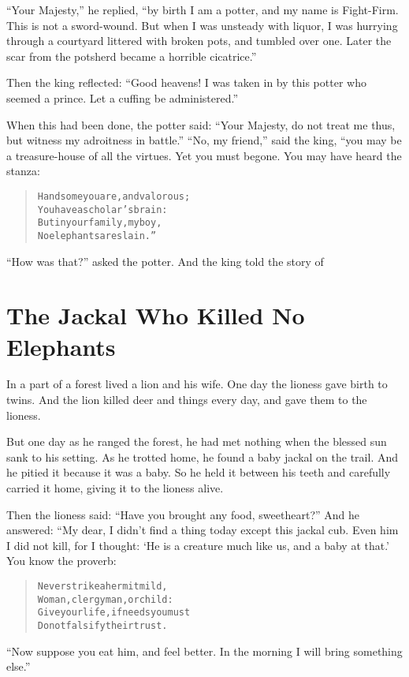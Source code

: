 \documentclass[article, twoside, 14pt]{memoir}
\renewenvironment{verbatim}{%
\begin{quote}%
\vskip -10pt%
\begin{alltt}\normalfont\large}{\end{alltt}%
\end{quote}%
\vskip -10pt
} %
\begin{document}
``Your Majesty,'' he replied,
``by birth I am a potter, and my name is Fight-Firm. This is not a sword-wound. But when I was unsteady with liquor, I was hurrying through a courtyard littered with broken pots, and tumbled over one. Later the scar from the potsherd became a horrible cicatrice.''

Then the king reflected:
``Good heavens! I was taken in by this potter who seemed a prince. Let a cuffing be administered.''

When this had been done, the potter said:
``Your Majesty, do not treat me thus, but witness my adroitness in battle.''
``No, my friend,'' said the king, “you may be a treasure-house of
all the virtues. Yet you must begone. You may have heard the
stanza:

\begin{verbatim}
Handsome you are, and valorous;
    You have a scholar's brain:
But in your family, my boy,
    No elephants are slain.”
\end{verbatim}
``How was that?'' asked the potter. And the king told the story of

\chapter{The Jackal Who Killed No Elephants}

\label{s70}

In a part of a forest lived a lion and his wife. One day the
lioness gave birth to twins. And the lion killed deer and things
every day, and gave them to the lioness.

But one day as he ranged the forest, he had met nothing when the
blessed sun sank to his setting. As he trotted home, he found a
baby jackal on the trail. And he pitied it because it was a baby.
So he held it between his teeth and carefully carried it home,
giving it to the lioness alive.

Then the lioness said: ``Have you brought any food, sweetheart?''
And he answered: “My dear, I didn't find a thing today except this
jackal cub. Even him I did not kill, for I thought:
`He is a creature much like us, and a baby at that.' You know the
proverb:

\begin{verbatim}
Never strike a hermit mild,
Woman, clergyman, or child:
Give your life, if needs you must{\textemdash}
Do not falsify their trust.
\end{verbatim}
``Now suppose you eat him, and feel better. In the morning I will bring something else.''
\end{document}
